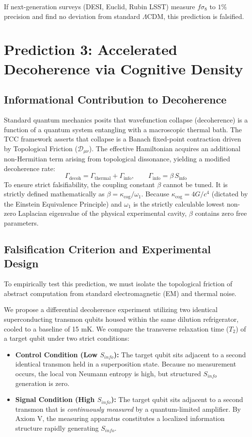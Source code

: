 \documentclass[12pt,openany]{book}
\theoremstyle{plain}
\theoremstyle{definition}
\theoremstyle{remark}
\begin{document}
If next-generation surveys (DESI, Euclid, Rubin LSST) measure $f\sigma_8$ to $1\%$ precision and find no deviation from standard $\Lambda$CDM, this prediction is falsified.

\chapter{Prediction 3: Accelerated Decoherence via Cognitive Density}

\section{Informational Contribution to Decoherence}

Standard quantum mechanics posits that wavefunction collapse (decoherence) is a function of a quantum system entangling with a macroscopic thermal bath. The TCC framework asserts that collapse is a Banach fixed-point contraction driven by Topological Friction ($\mathcal{D}_{\mu\nu}$). The effective Hamiltonian acquires an additional non-Hermitian term arising from topological dissonance, yielding a modified decoherence rate:
\[
\Gamma_{\text{decoh}} 
= \Gamma_{\text{thermal}} 
+ \Gamma_{\text{info}},
\qquad
\Gamma_{\text{info}} = \beta \, S_{\text{info}}
\]
To ensure strict falsifiability, the coupling constant $\beta$ cannot be tuned. It is strictly defined mathematically as $\beta = \kappa_{\text{cog}} / \omega_1$. Because $\kappa_{\text{cog}} = 4G/c^4$ (dictated by the Einstein Equivalence Principle) and $\omega_1$ is the strictly calculable lowest non-zero Laplacian eigenvalue of the physical experimental cavity, $\beta$ contains zero free parameters.

\section{Falsification Criterion and Experimental Design}

To empirically test this prediction, we must isolate the topological friction of abstract computation from standard electromagnetic (EM) and thermal noise. 

We propose a differential decoherence experiment utilizing two identical superconducting transmon qubits housed within the same dilution refrigerator, cooled to a baseline of 15 mK. We compare the transverse relaxation time ($T_2$) of a target qubit under two strict conditions:
\begin{itemize}
    \item \textbf{Control Condition (Low $S_{info}$):} The target qubit sits adjacent to a second identical transmon held in a superposition state. Because no measurement occurs, the local von Neumann entropy is high, but structured $S_{info}$ generation is zero.
    \item \textbf{Signal Condition (High $S_{info}$):} The target qubit sits adjacent to a second transmon that is \textit{continuously measured} by a quantum-limited amplifier. By Axiom V, the measuring apparatus constitutes a localized information structure rapidly generating $S_{info}$.
\end{itemize}
\end{document}
